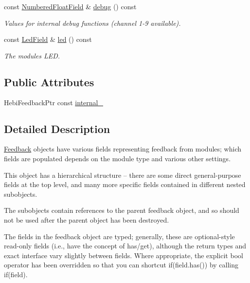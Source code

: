 \begin{DoxyCompactItemize}
\mbox{\label{classhebi_1_1Feedback_a6055f723814e0a09e5f3ad06d1811233}} 
const \hyperlink{classhebi_1_1Feedback_1_1NumberedFloatField}{Numbered\+Float\+Field} \& \hyperlink{classhebi_1_1Feedback_a6055f723814e0a09e5f3ad06d1811233}{debug} () const
\begin{DoxyCompactList}\small\item\em Values for internal debug functions (channel 1-\/9 available). \end{DoxyCompactList}\item 
\mbox{\label{classhebi_1_1Feedback_afc5d1ffbbe77a3f95f239e09820c2570}} 
const \hyperlink{classhebi_1_1Feedback_1_1LedField}{Led\+Field} \& \hyperlink{classhebi_1_1Feedback_afc5d1ffbbe77a3f95f239e09820c2570}{led} () const
\begin{DoxyCompactList}\small\item\em The module\textquotesingle{}s L\+ED. \end{DoxyCompactList}\end{DoxyCompactItemize}
\subsection*{Public Attributes}
\begin{DoxyCompactItemize}
\item 
Hebi\+Feedback\+Ptr const \hyperlink{classhebi_1_1Feedback_ae91da5bbb8a77c135981df418d7515b1}{internal\+\_\+}
\end{DoxyCompactItemize}


\subsection{Detailed Description}
\hyperlink{classhebi_1_1Feedback}{Feedback} objects have various fields representing feedback from modules; which fields are populated depends on the module type and various other settings. 

This object has a hierarchical structure -- there are some direct general-\/purpose fields at the top level, and many more specific fields contained in different nested subobjects.

The subobjects contain references to the parent feedback object, and so should not be used after the parent object has been destroyed.

The fields in the feedback object are typed; generally, these are optional-\/style read-\/only fields (i.\+e., have the concept of has/get), although the return types and exact interface vary slightly between fields. Where appropriate, the explicit bool operator has been overridden so that you can shortcut {\ttfamily if}(field.\+has()) by calling {\ttfamily if(field)}.

